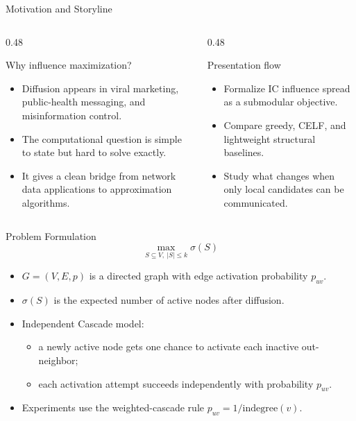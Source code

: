 \documentclass[10pt, aspectratio=169]{beamer}
\begin{document}
\begin{frame}{Motivation and Storyline}
    \begin{columns}[T,onlytextwidth]
        \begin{column}{0.48\linewidth}
            \begin{block}{Why influence maximization?}
                \begin{itemize}
                    \item Diffusion appears in viral marketing, public-health messaging, and misinformation control.
                    \item The computational question is simple to state but hard to solve exactly.
                    \item It gives a clean bridge from network data applications to approximation algorithms.
                \end{itemize}
            \end{block}
        \end{column}
        \begin{column}{0.48\linewidth}
            \begin{block}{Presentation flow}
                \begin{itemize}
                    \item Formalize IC influence spread as a submodular objective.
                    \item Compare greedy, CELF, and lightweight structural baselines.
                    \item Study what changes when only local candidates can be communicated.
                \end{itemize}
            \end{block}
        \end{column}
    \end{columns}
\end{frame}

\begin{frame}{Problem Formulation}
    \[
        \max_{S\subseteq V,\ |S|\leq k} \sigma(S)
    \]
    \begin{itemize}
        \item $G=(V,E,p)$ is a directed graph with edge activation probability $p_{uv}$.
        \item $\sigma(S)$ is the expected number of active nodes after diffusion.
        \item Independent Cascade model:
        \begin{itemize}
            \item a newly active node gets one chance to activate each inactive out-neighbor;
            \item each activation attempt succeeds independently with probability $p_{uv}$.
        \end{itemize}
        \item Experiments use the weighted-cascade rule $p_{uv}=1/\mathrm{indegree}(v)$.
    \end{itemize}
\end{frame}
\end{document}
